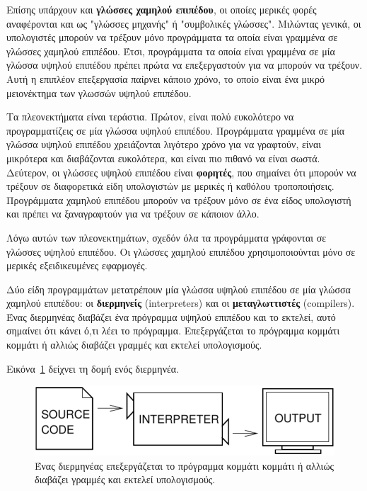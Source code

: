 \documentclass[10pt]{book}
\begin{document}
 Επίσης υπάρχουν και {\bf γλώσσες χαμηλού επιπέδου}, οι οποίες μερικές φορές
αναφέρονται και ως "γλώσσες μηχανής" ή "συμβολικές γλώσσες".  Μιλώντας γενικά, οι
υπολογιστές μπορούν να τρέξουν μόνο προγράμματα τα οποία είναι γραμμένα σε γλώσσες
χαμηλού επιπέδου.  Έτσι, προγράμματα τα οποία είναι γραμμένα σε μία γλώσσα υψηλού
επιπέδου πρέπει πρώτα να επεξεργαστούν για να μπορούν να τρέξουν.  Αυτή η επιπλέον
επεξεργασία παίρνει κάποιο χρόνο, το οποίο είναι ένα μικρό μειονέκτημα των γλωσσών
υψηλού επιπέδου.


 Τα πλεονεκτήματα είναι τεράστια.  Πρώτον, είναι πολύ ευκολότερο
να προγραμματίζεις σε μία γλώσσα υψηλού επιπέδου.  Προγράμματα γραμμένα
σε μία γλώσσα υψηλού επιπέδου χρειάζονται λιγότερο χρόνο για να γραφτούν,
είναι μικρότερα και διαβάζονται ευκολότερα, και είναι πιο πιθανό να είναι
σωστά.  Δεύτερον, οι γλώσσες υψηλού επιπέδου είναι {\bf φορητές}, που σημαίνει
ότι μπορούν να τρέξουν σε διαφορετικά είδη υπολογιστών με μερικές ή καθόλου
τροποποιήσεις.  Προγράμματα χαμηλού επιπέδου μπορούν να τρέξουν μόνο σε ένα είδος
υπολογιστή και πρέπει να ξαναγραφτούν για να τρέξουν σε κάποιον άλλο.

Λόγω αυτών των πλεονεκτημάτων, σχεδόν όλα τα προγράμματα γράφονται σε
γλώσσες υψηλού επιπέδου.  Οι γλώσσες χαμηλού επιπέδου χρησιμοποιούνται μόνο
σε μερικές εξειδικευμένες εφαρμογές.


Δύο είδη προγραμμάτων μετατρέπουν μία γλώσσα υψηλού επιπέδου σε μία
γλώσσα χαμηλού επιπέδου: οι {\bf διερμηνείς} (interpreters) και οι {\bf μεταγλωττιστές} (compilers).  
Ένας διερμηνέας διαβάζει ένα πρόγραμμα υψηλού επιπέδου και το εκτελεί,
αυτό σημαίνει ότι κάνει ό,τι λέει το πρόγραμμα.  Επεξεργάζεται το πρόγραμμα
κομμάτι κομμάτι ή αλλιώς διαβάζει γραμμές και εκτελεί υπολογισμούς.

Εικόνα~\ref{fig.interpret} δείχνει τη δομή ενός διερμηνέα.

\begin{figure}
\centerline
{\includegraphics[scale=0.9]{figs/interpret.pdf}}
\caption{Ένας διερμηνέας επεξεργάζεται το πρόγραμμα
κομμάτι κομμάτι ή αλλιώς διαβάζει γραμμές και εκτελεί υπολογισμούς.}
\label{fig.interpret}
\end{figure}
\end{document}
